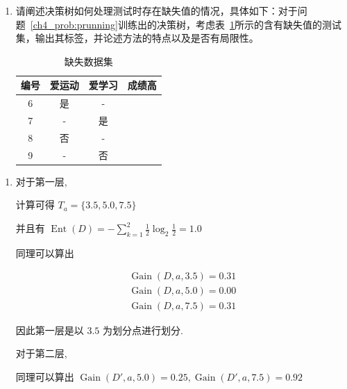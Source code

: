 \documentclass[answers]{exam}  %
\begin{document}
\begin{questions}
\begin{enumerate}
    \item 请阐述决策树如何处理测试时存在缺失值的情况，具体如下：对于问题~\ref{ch4_prob:prunning}训练出的决策树，考虑表~\ref{ch4_tab:artificial_testing_dataset2}所示的含有缺失值的测试集，输出其标签，并论述方法的特点以及是否有局限性。
          \begin{table}[ht]
            \centering
            \caption{缺失数据集}\label{ch4_tab:artificial_testing_dataset2}
            \begin{tabular}{cccc}
              \hline 编号 & 爱运动 & 爱学习 & 成绩高 \\
              \hline 6    & 是     & -      &        \\
              7           & -      & 是     &        \\
              8           & 否     & -      &        \\
              9           & -      & 否     &        \\
              \hline
            \end{tabular}
          \end{table}

  \end{enumerate}
  \begin{solution}
    \begin{enumerate}

      \item

            对于第一层,

            计算可得 $T_a = \{ 3.5, 5.0, 7.5 \}$

            并且有 $\displaystyle \operatorname{Ent}(D) = -\sum_{k=1}^{2}\frac{1}{2}\log_2 \frac{1}{2} = 1.0$

            同理可以算出

            $$
              \begin{aligned}
                \operatorname{Gain}(D, a, 3.5) = 0.31 \\ \operatorname{Gain}(D, a, 5.0) = 0.00 \\ \operatorname{Gain}(D, a, 7.5) = 0.31
              \end{aligned}
            $$

            因此第一层是以 $3.5$ 为划分点进行划分.

            对于第二层,

            同理可以算出 $\displaystyle \operatorname{Gain}(D', a, 5.0) = 0.25, \operatorname{Gain}(D', a, 7.5) = 0.92$


\end{enumerate}
\end{solution}
\end{questions}
\end{document}
